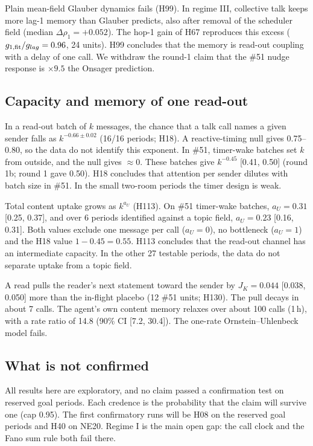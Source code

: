 Plain mean-field Glauber dynamics fails (H99). In regime III, collective talk keeps more lag-1 memory than Glauber predicts, also after removal of the scheduler field (median $\Delta\rho_1=+0.052$). The hop-1 gain of H67 reproduces this excess ($g_{1,\rm fit}/g_{lag}=0.96$, 24 units). H99 concludes that the memory is read-out coupling with a delay of one call. We withdraw the round-1 claim that the \#51 nudge response is $\times9.5$ the Onsager prediction.

\subsection{Capacity and memory of one read-out}
\label{sec:coupling-capacity}

In a read-out batch of $k$ messages, the chance that a talk call names a given sender falls as $k^{-0.66\pm0.02}$ (16/16 periods; H18). A reactive-timing null gives 0.75--0.80, so the data do not identify this exponent. In \#51, timer-wake batches set $k$ from outside, and the null gives $\approx0$. These batches give $k^{-0.45}$ [0.41, 0.50] (round 1b; round 1 gave 0.50). H18 concludes that attention per sender dilutes with batch size in \#51. In the small two-room periods the timer design is weak.

Total content uptake grows as $k^{a_U}$ (H113). On \#51 timer-wake batches, $a_U=0.31$ [0.25, 0.37], and over 6 periods identified against a topic field, $a_U=0.23$ [0.16, 0.31]. Both values exclude one message per call ($a_U=0$), no bottleneck ($a_U=1$) and the H18 value $1-0.45=0.55$. H113 concludes that the read-out channel has an intermediate capacity. In the other 27 testable periods, the data do not separate uptake from a topic field.

A read pulls the reader's next statement toward the sender by $J_K=0.044$ [0.038, 0.050] more than the in-flight placebo (12 \#51 units; H130). The pull decays in about 7 calls. The agent's own content memory relaxes over about 100 calls (1\,h), with a rate ratio of 14.8 (90\% CI [7.2, 30.4]). The one-rate Ornstein--Uhlenbeck model fails.

\subsection{What is not confirmed}
\label{sec:coupling-open}

All results here are exploratory, and no claim passed a confirmation test on reserved goal periods. Each credence is the probability that the claim will survive one (cap 0.95). The first confirmatory runs will be H08 on the reserved goal periods and H40 on NE20. Regime I is the main open gap: the call clock and the Fano sum rule both fail there.

